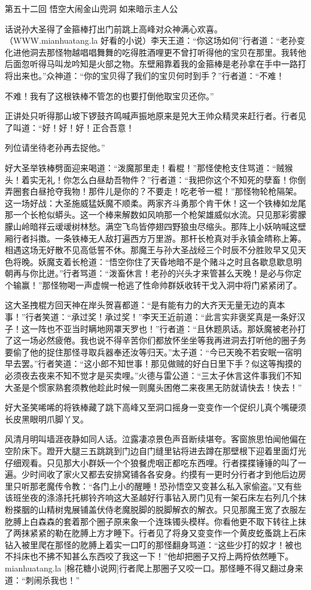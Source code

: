 \documentclass[12pt,UTF8]{ctexbook}
\begin{document}
第五十二回 悟空大闹金山兜洞 如来暗示主人公

话说孙大圣得了金箍棒打出门前跳上高峰对众神满心欢喜。（WWW.mianhuatang.la 好看的小说）李天王道：“你这场如何”行者道：“老孙变化进他洞去那怪物越唱唱舞舞的吃得胜酒哩更不曾打听得他的宝贝在那里。我转他后面忽听得马叫龙吟知是火部之物。东壁厢靠着我的金箍棒是老孙拿在手中一路打将出来也。”众神道：“你的宝贝得了我们的宝贝何时到手？”行者道：“不难！

不难！我有了这根铁棒不管怎的也要打倒他取宝贝还你。”

正讲处只听得那山坡下锣鼓齐鸣喊声振地原来是兕大王帅众精灵来赶行者。行者见了叫道：“好！好！好！正合吾意！

列位请坐待老孙再去捉他。”

好大圣举铁棒劈面迎来喝道：“泼魔那里走！看棍！”那怪使枪支住骂道：“贼猴头！着实无礼！你怎么白昼劫吾物件？”行者道：“我把你这个不知死的孽畜！你倒弄圈套白昼抢夺我物！那件儿是你的？不要走！吃老爷一棍！”那怪物轮枪隔架。这一场好战：大圣施威猛妖魔不顺柔。两家齐斗勇那个肯干休！这一个铁棒如龙尾那一个长枪似蟒头。这一个棒来解数如风响那一个枪架雄威似水流。只见那彩雾朦朦山岭暗祥云叆叆树林愁。满空飞鸟皆停翅四野狼虫尽缩头。那阵上小妖呐喊这壁厢行者抖擞。一条铁棒无人敌打遍西方万里游。那杆长枪真对手永镇金皘称上筹。相遇这场无好散不见高低誓不休。那魔王与孙大圣战经三个时辰不分胜败早又见天色将晚。妖魔支着长枪道：“悟空你住了天昏地暗不是个赌斗之时且各歇息歇息明朝再与你比迸。”行者骂道：“泼畜休言！老孙的兴头才来管甚么天晚！是必与你定个输赢！”那怪物喝一声虚幌一枪逃了性命帅群妖收转干戈入洞中将门紧紧闭了。

这大圣拽棍方回天神在岸头贺喜都道：“是有能有力的大齐天无量无边的真本事！”行者笑道：“承过奖！承过奖！”李天王近前道：“此言实非褒奖真是一条好汉子！这一阵也不亚当时瞒地网罩天罗也！”行者道：“且休题夙话。那妖魔被老孙打了这一场必然疲倦。我也说不得辛苦你们都放怀坐坐等我再进洞去打听他的圈子务要偷了他的捉住那怪寻取兵器奉还汝等归天。”太子道：“今已天晚不若安眠一宿明早去罢。”行者笑道：“这小郎不知世事！那见做贼的好白日里下手？似这等掏摸的必须夜去夜来不知不觉才是买卖哩。”火德与雷公道：“三太子休言这件事我们不知大圣是个惯家熟套须教他趁此时候一则魔头困倦二来夜黑无防就请快去！快去！”

好大圣笑唏唏的将铁棒藏了跳下高峰又至洞口摇身一变变作一个促织儿真个嘴硬须长皮黑眼明爪脚丫叉。

风清月明叫墙涯夜静如同人话。泣露凄凉景色声音断续堪夸。客窗旅思怕闻他偏在空阶床下。蹬开大腿三五跳跳到门边自门缝里钻将进去蹲在那壁根下迎着里面灯光仔细观看。只见那大小群妖一个个狼餐虎咽正都吃东西哩。行者揲揲锤锤的叫了一遍。少时间收了家火又都去安排窝铺各各安身。约摸有一更时分行者才到他后边房里只听那老魔传令教：“各门上小的醒睡！恐孙悟空又变甚么私入家偷盗。”又有些该班坐夜的涤涤托托梆铃齐响这大圣越好行事钻入房门见有一架石床左右列几个抹粉搽胭的山精树鬼展铺盖伏侍老魔脱脚的脱脚解衣的解衣。只见那魔王宽了衣服左肐膊上白森森的套着那个圈子原来象一个连珠镯头模样。你看他更不取下转往上抹了两抹紧紧的勒在肐膊上方才睡下。行者见了将身又变变作一个黄皮虼蚤跳上石床钻入被里爬在那怪的肐膊上着实一口叮的那怪翻身骂道：“这些少打的奴才！被也不抖床也不拂不知甚么东西咬了我这一下！”他却把圈子又捋上两捋依然睡下。mianhuatang.la [棉花糖小说网]行者爬上那圈子又咬一口。那怪睡不得又翻过身来道：“刺闹杀我也！”
\end{document}
